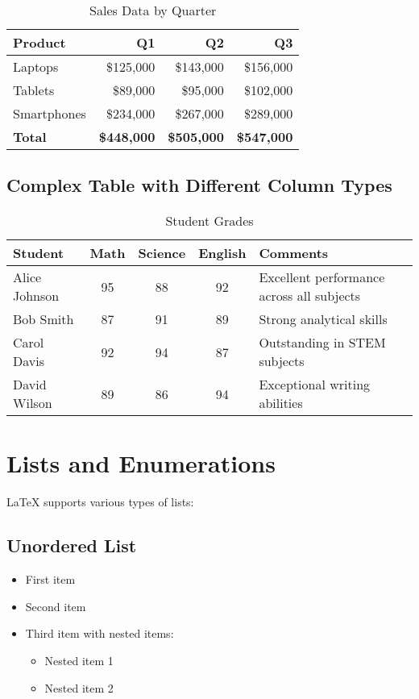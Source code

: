 \documentclass[12pt]{article}
\begin{document}
\begin{table}[h]
\centering
\caption{Sales Data by Quarter}
\begin{tabular}{lrrr}
\toprule
\textbf{Product} & \textbf{Q1} & \textbf{Q2} & \textbf{Q3} \\
\midrule
Laptops & \$125,000 & \$143,000 & \$156,000 \\
Tablets & \$89,000 & \$95,000 & \$102,000 \\
Smartphones & \$234,000 & \$267,000 & \$289,000 \\
\midrule
\textbf{Total} & \textbf{\$448,000} & \textbf{\$505,000} & \textbf{\$547,000} \\
\bottomrule
\end{tabular}
\end{table}

\subsection{Complex Table with Different Column Types}

\begin{table}[h]
\centering
\caption{Student Grades}
\begin{tabular}{|l|c|c|c|p{3cm}|}
\hline
\textbf{Student} & \textbf{Math} & \textbf{Science} & \textbf{English} & \textbf{Comments} \\
\hline
Alice Johnson & 95 & 88 & 92 & Excellent performance across all subjects \\
Bob Smith & 87 & 91 & 89 & Strong analytical skills \\
Carol Davis & 92 & 94 & 87 & Outstanding in STEM subjects \\
David Wilson & 89 & 86 & 94 & Exceptional writing abilities \\
\hline
\end{tabular}
\end{table}

\section{Lists and Enumerations}

LaTeX supports various types of lists:

\subsection{Unordered List}
\begin{itemize}
    \item First item
    \item Second item
    \item Third item with nested items:
    \begin{itemize}
        \item Nested item 1
        \item Nested item 2
    \end{itemize}
\end{itemize}
\end{document}
